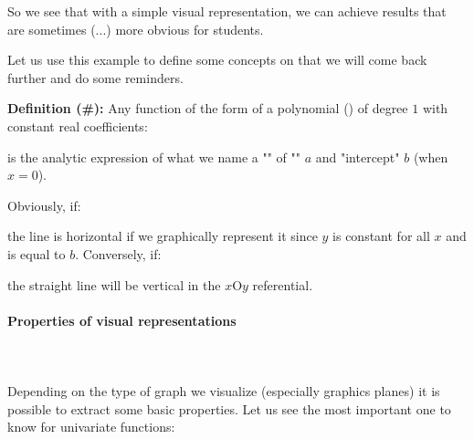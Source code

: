 	So we see that with a simple visual representation, we can achieve results that are sometimes (...) more obvious for students.
	
	Let us use this example to define some concepts on that we will come back further and do some reminders.
	
	\textbf{Definition (\#\mydef):} Any function of the form of a polynomial () of degree $1$ with constant real coefficients:
	
	is the analytic expression of what we name a "" of "" $a$ and "intercept" $b$ (when $x=0$).
	
	Obviously, if:
	
	the line is horizontal if we graphically represent it since $y$ is constant for all $x$ and is equal to $b$. Conversely, if:
	
	the straight line will be vertical in the $x\text{O}y$ referential.
	
	\paragraph{Properties of visual representations}\mbox{}\\\\
	Depending on the type of graph we visualize (especially graphics planes) it is possible to extract some basic properties. Let us see the most important one to know for univariate functions:
	
